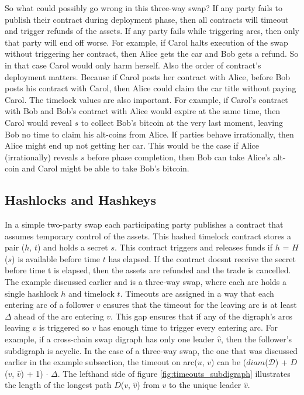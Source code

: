 So what could possibly go wrong in this three-way swap? If any party fails to publish their contract during deployment phase, then all contracts will timeout and trigger refunds of the assets. If any party fails while triggering arcs, then only that party will end off worse. For example, if Carol halts execution of the swap without triggering her contract, then Alice gets the car and Bob gets a refund. So in that case Carol would only harm herself. Also the order of contract's deployment matters. Because if Carol posts her contract with Alice, before Bob posts his contract with Carol, then Alice could claim the car title without paying Carol. The timelock values are also important. For example, if Carol's contract with Bob and Bob's contract with Alice would expire at the same time, then Carol would reveal $s$ to collect Bob's bitcoin at the very last moment, leaving Bob no time to claim his alt-coins from Alice. If parties behave irrationally, then Alice might end up not getting her car. This would be the case if Alice (irrationally) reveals $s$ before phase completion, then Bob can take Alice's alt-coin and Carol might be able to take Bob's bitcoin.


\subsection{Hashlocks and Hashkeys}
\label{subsec:background:second_section:hashlock_timelock}
In a simple two-party swap each participating party publishes a contract that assumes temporary control of the assets. This hashed timelock contract  stores a pair ($h$, $t$) and holds a secret $s$. This contract triggers and releases funds if $h$ = $H$($s$) is available before time $t$ has elapsed. If the contract doesnt receive the secret before time t is elapsed, then the assets are refunded and the trade is cancelled. The example discussed earlier and is a three-way swap, where each arc holds a single hashlock $h$ and timelock $t$. Timeouts are assigned in a way that each entering arc of a follower $v$ ensures that the timeout for the leaving arc is at least $\Delta$ ahead of the arc entering $v$. This gap ensures that if any of the digraph's arcs leaving $v$ is triggered so $v$ has enough time to trigger every entering arc. For example, if a cross-chain swap digraph has only one leader $\hat{v}$, then the follower's subdigraph is acyclic. In the case of a three-way swap, the one that was discussed earlier in the example subsection, the timeout on arc($u$, $v$) can be ($diam$($\mathcal{D}$) + $D$($v$, $\hat{v}$) + 1) $\cdot$ $\Delta$. The lefthand side of figure \ref{fig:timeouts_subdigraph} illustrates the length of the longest path $D$($v$, $\hat{v}$) from $v$ to the unique leader $\hat{v}$.


